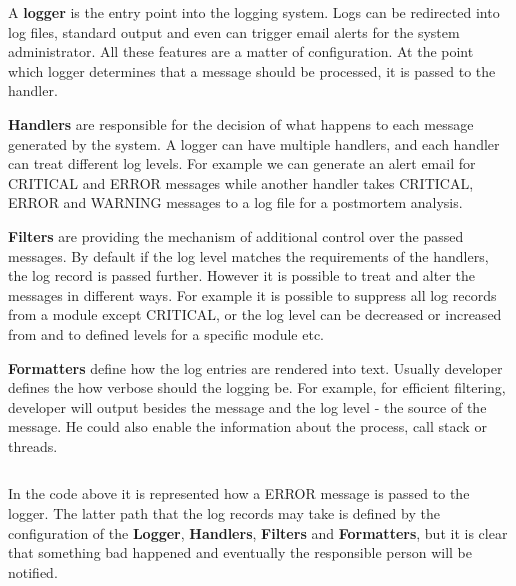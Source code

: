 \documentclass[12pt,oneside,a4paper]{article}
\begin{document}
A \textbf{logger} is the entry point into the logging system. Logs can be redirected into log files, standard output and even can trigger email alerts for the system administrator. All these features are a matter of configuration. At the point which logger determines that a message should be processed, it is passed to the handler.

\textbf{Handlers} are responsible for the decision of what happens to each message generated by the system. A logger can have multiple handlers, and each handler can treat different log levels. For example we can generate an alert email for CRITICAL and ERROR messages while another handler takes CRITICAL, ERROR and WARNING messages to a log file for a postmortem analysis.

\textbf{Filters} are providing the mechanism of additional control over the passed messages. By default if the log level matches the requirements of the handlers, the log record is passed further. However it is possible to treat and alter the messages in different ways. For example it is possible to suppress all log records from a module except CRITICAL, or the log level can be decreased or increased from and to defined levels for a specific module etc.

\textbf{Formatters} define how the log entries are rendered into text. Usually developer defines the how verbose should the logging be. For example, for efficient filtering, developer will output besides the message and the log level - the source of the message. He could also enable the information about the process, call stack or threads. 

\inputminted[linenos,baselinestretch=1,xleftmargin=0.5cm]{python}{src/logging.py}

In the code above it is represented how a ERROR message is passed to the logger. The latter path that the log records may take is defined by the configuration of the \textbf{Logger}, \textbf{Handlers}, \textbf{Filters} and \textbf{Formatters}, but it is clear that something bad happened and eventually the responsible person will be notified.
\end{document}
